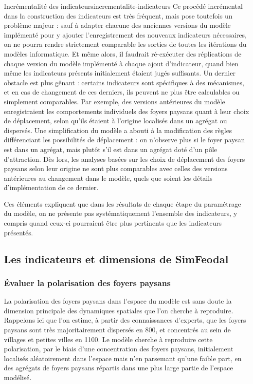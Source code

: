 \begin{encadre}{Incrémentalité des indicateurs}{incrementalite-indicateurs}
Ce procédé incrémental dans la construction des indicateurs est très fréquent, mais pose toutefois un problème majeur :
sauf à adapter chacune des anciennes versions du modèle implémenté pour y ajouter l'enregistrement des nouveaux indicateurs nécessaires, on ne pourra rendre strictement comparable les sorties de toutes les itérations du modèles informatique.
Et même alors, il faudrait ré-exécuter des réplications de chaque version du modèle implémenté à chaque ajout d'indicateur, quand bien même les indicateurs présents initialement étaient jugés suffisants.
Un dernier obstacle est plus gênant :
certains indicateurs sont spécifiques à des mécanismes, et en cas de changement de ces derniers, ils peuvent ne plus être calculables ou simplement comparables.
Par exemple, des versions antérieures du modèle enregistraient les comportements individuels des foyers paysans quant à leur \og choix\fg{} de déplacement, selon qu'ils étaient à l'origine localisés dans un agrégat ou dispersés.
Une simplification du modèle a abouti à la modification des règles différenciant les possibilités de déplacement :
on n'observe plus si le foyer paysan est dans un agrégat, mais plutôt s'il est dans un agrégat doté d'un pôle d'attraction.
Dès lors, les analyses basées sur les choix de déplacement des foyers paysans selon leur origine ne sont plus comparables avec celles des versions antérieures au changement dans le modèle, quels que soient les détails d'implémentation de ce dernier.

Ces éléments expliquent que dans les résultats de chaque étape du paramétrage du modèle, on ne présente pas systématiquement l'ensemble des indicateurs, y compris quand ceux-ci pourraient être plus pertinents que les indicateurs présentés.
\end{encadre}

\clearpage
\subsection{Les indicateurs et dimensions de SimFeodal}

\subsubsection{Évaluer la polarisation des foyers paysans \label{subsub:polarisation}}

La polarisation des foyers paysans dans l'espace du modèle est sans doute la dimension principale des dynamiques spatiales que l'on cherche à reproduire.
Rappelons ici que l'on estime, à partir des connaissances d'experts, que les foyers paysans sont très majoritairement dispersés en 800, et concentrés au sein de villages et petites villes en 1100.
Le modèle cherche à reproduire cette polarisation, par le biais d'une concentration des foyers paysans, initialement localisés aléatoirement dans l'espace mais n'en parsemant qu'une faible part, en des agrégats de foyers paysans répartis dans une plus large partie de l'espace modélisé.

